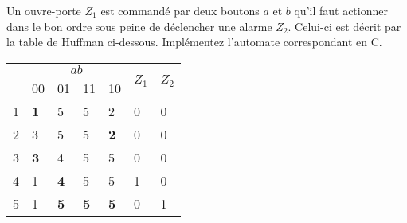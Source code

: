 \begin{Q}
	Un ouvre-porte $Z_1$ est commandé par deux boutons $a$ et $b$ qu'il faut actionner dans le bon ordre sous peine de déclencher une alarme $Z_2$.
	Celui-ci est décrit par la table de Huffman ci-dessous.
	Implémentez l'automate correspondant en C.

	\begin{center}
		\begin{tabular}{|l|l|l|l|l|l|l|} \hline
			\multirow{2}{*}{} & \multicolumn{4}{c|}{$ab$} & \multirow{2}{*}{$Z_1$} & \multirow{2}{*}{$Z_2$} \\ \cline{2-5}
			& 00 & 01 & 11 & 10 & & \\ \hline
			1 & \textbf{1} & 5 & 5 & 2 & 0 & 0 \\ \hline
			2 & 3 & 5 & 5 & \textbf{2} & 0 & 0 \\ \hline
			3 & \textbf{3} & 4 & 5 & 5 & 0 & 0 \\ \hline
			4 & 1 & \textbf{4} & 5 & 5 & 1 & 0 \\ \hline
			5 & 1 & \textbf{5} & \textbf{5} & \textbf{5} & 0 & 1 \\ \hline
		\end{tabular}
	\end{center}

\reponse{}%
\end{Q}
